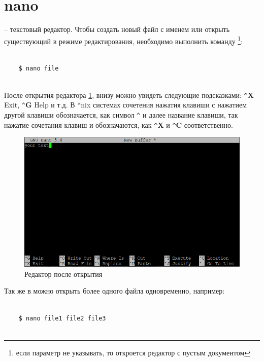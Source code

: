 \section{nano}

\noindent
{} -- текстовый редактор. Чтобы создать новый файл с именем  или открыть существующий в режиме редактирования, необходимо выполнить команду \footnote{если параметр  не указывать, то откроется редактор с пустым документом}:

\begin{lstlisting}
	
	$ nano file
	
\end{lstlisting}	

После открытия редактора  \ref{fig:nano}, внизу можно увидеть следующие подсказками: \verb|^|\textbf{X} Exit, \verb|^|\textbf{G} Help и т.д. В *nix системах сочетения нажатия клавиши  с нажатием другой клавиши обозначается, как символ \verb|^| и далее название клавиши, так нажатие сочетания клавиш  и  обозначаются, как \verb|^|\textbf{X} и \verb|^|\textbf{C} соответственно.

\begin{figure}[h]
\centering
	\includegraphics[width=\textwidth]{img/ch1/nano.png}
	\caption{Редактор  после открытия}
	\label{fig:nano}
\end{figure}

Так же в  можно открыть более одного файла одновременно, например:
\begin{lstlisting}
	
	$ nano file1 file2 file3
	
\end{lstlisting}	

